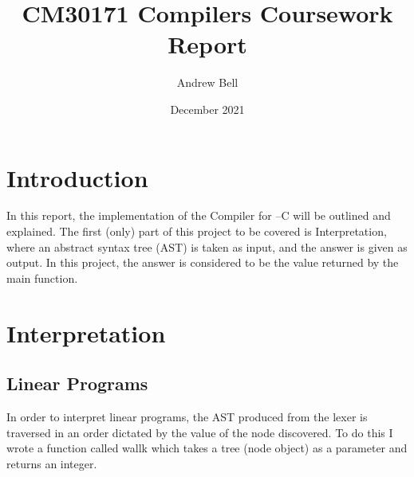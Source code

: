 \documentclass[11pt]{article}
\author{Andrew Bell}
\title{CM30171 Compilers Coursework Report}
\date{December 2021}
\begin{document}
\maketitle

\section*{Introduction}

In this report, the implementation of the Compiler for --C will be outlined and explained. The first (only) part of this project to be covered is Interpretation, where an abstract syntax tree (AST) is taken as input, and the answer is given as output. In this project, the answer is considered to be the value returned by the main function. 

\section*{Interpretation}

\subsection{Linear Programs}

In order to interpret linear programs, the AST produced from the lexer is traversed in an order dictated by the value of the node discovered. To do this I wrote a function called wallk which takes a tree (node object) as a parameter and returns an integer. 
\end{document}
